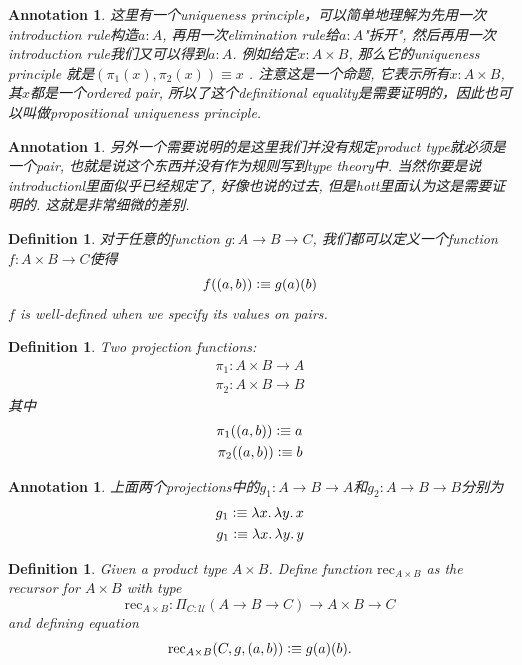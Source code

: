 \documentclass{article}
\newtheorem{definition}[theorem]{Definition}
\newtheorem{annotation}[theorem]{Annotation}
\newcommand{\lam}[2]{\ensuremath{\lambda #1\ldotp #2}} %
\newcommand{\defeqv}{\vcentcolon\equiv}
\begin{document}
\begin{annotation}
\rm 这里有一个uniqueness principle，可以简单地理解为先用一次introduction rule构造$a : A$, 再用一次elimination rule给$a : A$"拆开", 然后再用一次introduction rule我们又可以得到$a : A$. 例如给定$x : A \times B$, 那么它的uniqueness principle 就是$(\pi_1(x), \pi_2(x)) \equiv x$ . 注意这是一个命题, 它表示所有$x : A \times B$, 其$x$都是一个ordered pair, 所以了这个definitional equality是需要证明的，因此也可以叫做propositional uniqueness principle. 
\end{annotation}

\begin{annotation}
\rm 另外一个需要说明的是这里我们并没有规定product type就必须是一个pair, 也就是说这个东西并没有作为规则写到type theory中. 当然你要是说introductionl里面似乎已经规定了, 好像也说的过去, 但是hott里面认为这是需要证明的. 这就是非常细微的差别.
\end{annotation}

\begin{definition}
\rm 对于任意的function $g: A \to B \to C$, 我们都可以定义一个function $f: A \times B \to C$使得
\[
	f((a,b)) \defeqv g(a)(b)
\]
$f$ is well-defined when we specify its values on pairs.
\end{definition}

\begin{definition}
\rm Two projection functions:
\[
	\begin{aligned}
	\pi_1: A \times B \to A \\
	\pi_2: A \times B \to B
	\end{aligned}
\]
其中
\[
	\begin{aligned}
	\pi_1((a,b)) \defeqv a \\
	\pi_2((a,b)) \defeqv b 
	\end{aligned}
\]
\end{definition}

\begin{annotation}
上面两个projections中的$g_1 : A \to B \to A$和$g_2: A \to B \to B$分别为
\[
    \begin{aligned}
    g_1 \defeqv \lam{x}{\lam{y}{x}} \\
    g_1 \defeqv \lam{x}{\lam{y}{y}}
    \end{aligned}
\]
\end{annotation}

\begin{definition}
\rm Given a product type $A \times B$. Define function $\text{rec}_{A \times B}$ as the recursor for $A \times B$ with type
\[
	\text{rec}_{A \times B}:\Pi_{C:\mathcal{U}}(A \to B \to C) \to A \times B \to C
\]
and defining equation
\[
	\text{rec}_{A \times B}(C, g, (a,b)) \defeqv g(a)(b).
\]
\end{definition}
\end{document}
